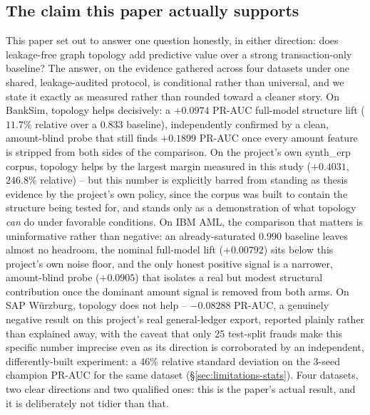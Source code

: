 \subsection{The claim this paper actually supports}
This paper set out to answer one question honestly, in either direction:
does leakage-free graph topology add predictive value over a strong
transaction-only baseline? The answer, on the evidence gathered across four
datasets under one shared, leakage-audited protocol, is conditional rather
than universal, and we state it exactly as measured rather than rounded
toward a cleaner story. On BankSim, topology helps decisively: a
$+0.0974$ PR-AUC full-model structure lift ($11.7\%$ relative over a $0.833$
baseline), independently confirmed by a clean, amount-blind probe that still
finds $+0.1899$ PR-AUC once every amount feature is stripped from both sides
of the comparison. On the project's own synth\_erp corpus, topology helps by
the largest margin measured in this study ($+0.4031$, $246.8\%$ relative) --
but this number is explicitly barred from standing as thesis evidence by the
project's own policy, since the corpus was built to contain the structure
being tested for, and stands only as a demonstration of what topology
\emph{can} do under favorable conditions. On IBM AML, the comparison that
matters is uninformative rather than negative: an already-saturated $0.990$
baseline leaves almost no headroom, the nominal full-model lift
($+0.00792$) sits below this project's own noise floor, and the only honest
positive signal is a narrower, amount-blind probe ($+0.0905$) that isolates a
real but modest structural contribution once the dominant amount signal is
removed from both arms. On SAP W\"urzburg, topology does not help --
$-0.08288$ PR-AUC, a genuinely negative result on this project's real
general-ledger export, reported plainly rather than explained away, with the
caveat that only 25 test-split frauds make this specific number imprecise
even as its direction is corroborated by an independent, differently-built
experiment: a 46\% relative standard deviation on the 3-seed champion PR-AUC
for the same dataset (\S\ref{sec:limitations-stats}).
Four datasets, two clear directions and two qualified ones: this is the
paper's actual result, and it is deliberately not tidier than that.

